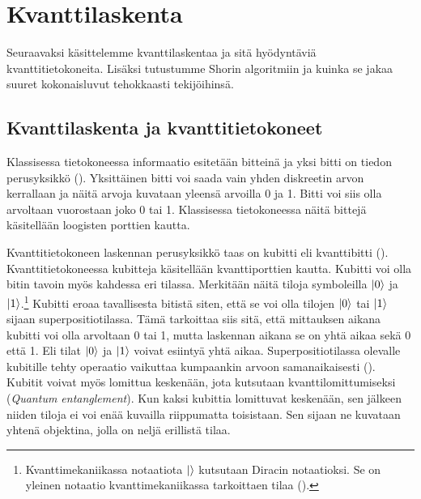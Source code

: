 \chapter{Kvanttilaskenta}
Seuraavaksi käsittelemme kvanttilaskentaa ja sitä hyödyntäviä kvanttitietokoneita. Lisäksi tutustumme Shorin algoritmiin ja kuinka se jakaa suuret kokonaisluvut tehokkaasti tekijöihinsä.

\section{Kvanttilaskenta ja kvanttitietokoneet}
Klassisessa tietokoneessa informaatio esitetään bitteinä ja yksi bitti on tiedon perusyksikkö (\cite{doi:10.1080/23742917.2016.1226650}). Yksittäinen bitti voi saada vain yhden diskreetin arvon kerrallaan ja näitä arvoja kuvataan yleensä arvoilla 0 ja 1. Bitti voi siis olla arvoltaan vuorostaan joko 0 tai 1. Klassisessa tietokoneessa näitä bittejä käsitellään loogisten porttien kautta.

Kvanttitietokoneen laskennan perusyksikkö taas on kubitti eli kvanttibitti (\cite{doi:10.1080/23742917.2016.1226650}). Kvanttitietokoneessa kubitteja käsitellään kvanttiporttien kautta. Kubitti voi olla bitin tavoin myös kahdessa eri tilassa. Merkitään näitä tiloja symboleilla
$\ket{0}$ ja $\ket{1}$.\footnote{Kvanttimekaniikassa notaatiota $\ket{}$ kutsutaan Diracin notaatioksi. Se on yleinen notaatio kvanttimekaniikassa tarkoittaen tilaa (\cite{nielsen2001quantum}).} Kubitti eroaa tavallisesta bitistä siten, että se voi olla tilojen $\ket{0}$ tai $\ket{1}$ sijaan superpositiotilassa. Tämä tarkoittaa siis sitä, että mittauksen aikana kubitti voi olla arvoltaan 0 tai 1, mutta laskennan aikana se on yhtä aikaa sekä 0 että 1. Eli tilat $\ket{0}$ ja $\ket{1}$ voivat esiintyä yhtä aikaa. Superpositiotilassa olevalle kubitille tehty operaatio vaikuttaa kumpaankin arvoon samanaikaisesti (\cite{mavroeidis2018impact}). Kubitit voivat myös lomittua keskenään, jota kutsutaan kvanttilomittumiseksi (\emph{Quantum entanglement}). Kun kaksi kubittia lomittuvat keskenään, sen jälkeen niiden tiloja ei voi enää kuvailla riippumatta toisistaan. Sen sijaan ne kuvataan yhtenä objektina, jolla on neljä erillistä tilaa.

